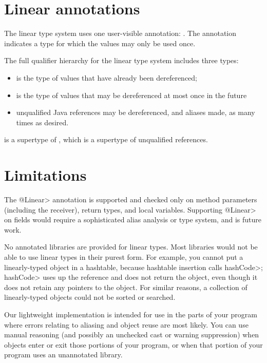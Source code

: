 \section{Linear annotations\label{linear-annotations}}

The linear type system uses one user-visible annotation:
.  The annotation indicates
a type for which the values may only be used once.


The full qualifier hierarchy for the linear type system includes three
types:
\begin{itemize}
\item
{} is the type of values that have already been dereferenced;
\item
{} is the type of values that may be dereferenced at
most once in the future
\item
unqualified 
Java references may be dereferenced, and aliases made, as many times as
desired.
\end{itemize}

\noindent
{} is a supertype of , which is a
supertype of unqualified references.



\section{Limitations\label{linear-limitations}}

The \<@Linear> annotation is supported and checked only on method
parameters (including the receiver), return types, and local variables.
Supporting \<@Linear> on fields would require a sophisticated alias
analysis or type system, and is future work.

No annotated libraries are provided for linear types.  Most libraries would
not be able to use linear types in their purest form.  For example, you
cannot put a linearly-typed object in a hashtable, because hashtable
insertion calls \<hashCode>; \<hashCode> uses up the reference and does not
return the object, even though it does not retain any pointers to the
object.  For similar reasons, a collection of linearly-typed objects could
not be sorted or searched.

Our lightweight implementation is intended for use in the parts of your
program where errors relating to aliasing and object reuse are most likely.
You can use manual reasoning (and possibly an unchecked cast or warning
suppression) when objects enter or exit those portions of your program, or
when that portion of your program uses an unannotated library.


